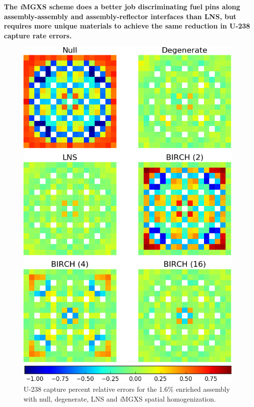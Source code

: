 
\begin{emphbox}
\textbf{The \textit{i}\ac{MGXS} scheme does a better job discriminating fuel pins along assembly-assembly and assembly-reflector interfaces than \ac{LNS}, but requires more unique materials to achieve the same reduction in U-238 capture rate errors.}
\end{emphbox}


\begin{figure}[h!]
\centering
\includegraphics[width=0.87\linewidth]{figures/results/spatial/assm-16/capt-err}
\vspace{2mm}
\caption[U-238 capture rate error spatial distributions]{U-238 capture percent relative errors for the 1.6\% enriched assembly with null, degenerate, \ac{LNS} and \textit{i}\ac{MGXS} spatial homogenization.}
\label{fig:chap11-assm-1.6-capt-err}
\end{figure}

